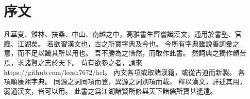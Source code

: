 \chapter*{序文}
凡華夏、雞林、扶桑、中山、南越之中，高雅書生齊嘗識漢文，通用於書塾、官廳、江湖矣。
若欲習漢文也，古之所寶字典及今也。
今所有字典雖說善詞彙之意，而不足以識其所以用也。
吾不勝為之惜然，而敢作此書。
然詞典之獨作頗苦焉，求諸賢之志於天下。
茍有欲參之者，請來 https://github.com/leesh7672/hcl。
內文各項或取諸漢籍，或從古道而新製。
各項順康熙字典。
同源之詞同項而登，異源之詞別項而載。
釋以漢文，詳述其用，弱通漢文，皆可以用。
此書之爲江湖諸賢所修與天下諸儒所寶甚遙遠。
